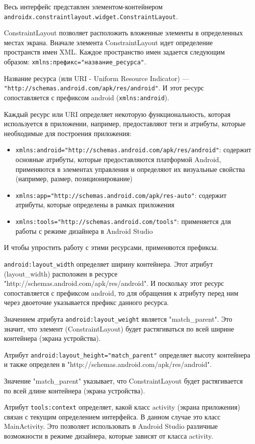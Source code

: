 Весь интерфейс представлен элементом-контейнером
\texttt{androidx.constraintlayout.widget.ConstraintLayout}.\par
ConstraintLayout позволяет расположить вложенные элементы в
определенных местах экрана. Вначале элемента ConstraintLayout идет
определение пространств имен XML.
Каждое пространство имен задается следующим образом:
\texttt{xmlns:префикс="название\_ресурса"}.\par
Название ресурса (или URI - Uniform Resource Indicator) ---
\texttt{"http://schemas.android.com/apk/res/android"}.
И этот ресурс сопоставляется с префиксом android (\texttt{xmlns:android}).\par
Каждый ресурс или URI определяет некоторую функциональность,
которая используется в приложении, например, предоставляют теги и атрибуты,
которые необходимые для построения приложения:
\begin{itemize}
	\item \texttt{xmlns:android="http://schemas.android.com/apk/res/android"}:
		содержит основные атрибуты, которые предоставляются платформой
		Android, применяются в элементах управления и определяют
		их визуальные свойства (например, размер, позиционирование)
	\item \texttt{xmlns:app="http://schemas.android.com/apk/res-auto"}:
		содержит атрибуты, которые определены в рамках приложения
	\item \texttt{xmlns:tools="http://schemas.android.com/tools"}:
		применяется для работы с режиме дизайнера в Android Studio
\end{itemize}

И чтобы упростить работу с этими ресурсами, применяются префиксы.\par
\texttt{android:layout\_width} определяет ширину контейнера. Этот атрибут
(layout\_width) расположен в ресурсе
"http://schemas.android.com/apk/res/android". И поскольку этот ресурс
сопоставляется с префиксом android, то для обращения к атрибуту перед ним
через двоеточие указывается префикс данного ресурса.\par
Значением атрибута \texttt{android:layout\_weight} является
"match\_parent". Это значит, что элемент (ConstraintLayout)
будет растягиваться по всей ширине контейнера (экрана устройства).\par
Атрибут \texttt{android:layout\_height="match\_parent"} определяет высоту
контейнера и также определен в
"http://schemas.android.com/apk/res/android".\par
Значение "match\_parent" указывает, что ConstraintLayout
будет растягивается по всей длине контейнера (экрана устройства).\par
Атрибут \texttt{tools:context} определяет, какой класс
activity (экрана приложения) связан с текущим определением интерфейса.
В данном случае это класс MainActivity. Это позволяет использовать
в Android Studio различные возможности в режиме дизайнера,
которые зависят от класса activity.


